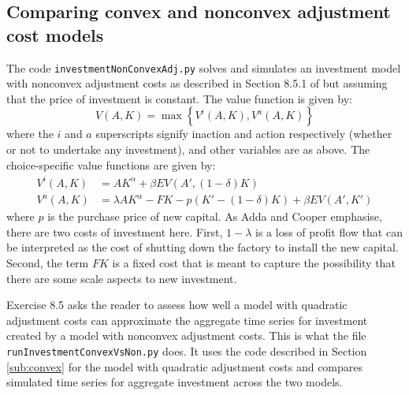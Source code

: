 \subsection{Comparing convex and nonconvex adjustment cost models}

The code \texttt{investmentNonConvexAdj.py} solves and simulates an investment model with nonconvex adjustment costs as described in Section 8.5.1 of \citet{adda2003dynamic} but assuming that the price of investment is constant. The value function is given by:
%
\begin{equation}
	V(A, K) = \max \left\{ V^i(A, K), V^a(A, K) \right\}
\end{equation}
%
where the \(i\) and \(a\) superscripts signify inaction and action respectively (whether or not to undertake any investment), and other variables are as above. The choice-specific value functions are given by:
%
\begin{align}
 V^i(A, K) &=  AK^{\alpha} + \beta E V(A', (1 - \delta)K) \\
 V^a(A, K) &=  \lambda AK^{\alpha} - FK - p(K' - (1 - \delta)K) + \beta E V(A', K')
\end{align}
%
where \(p\) is the purchase price of new capital. As Adda and Cooper emphasise, there are two costs of investment here. First, \(1 - \lambda\) is a loss of profit flow that can be interpreted as the cost of shutting down the factory to install the new capital. Second, the term \(FK\) is a fixed cost that is meant to capture the possibility that there are some scale aspects to new investment.

Exercise 8.5 asks the reader to assess how well a model with quadratic adjustment costs can approximate the aggregate time series for investment created by a model with nonconvex adjustment costs. This is what the file \texttt{runInvestmentConvexVsNon.py} does. It uses the code described in Section \ref{sub:convex} for the model with quadratic adjustment costs and compares simulated time series for aggregate investment across the two models.